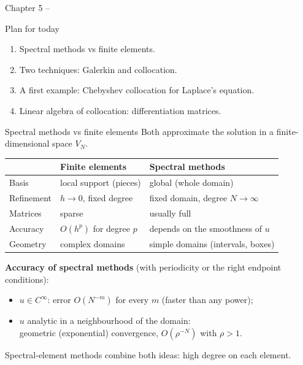 
{Chapter 5}
{}
{--}

\begin{frame}{Plan for today}
    \begin{enumerate}
        \item Spectral methods vs finite elements.
        \item Two techniques: Galerkin and collocation.
        \item A first example: Chebyshev collocation for Laplace's equation.
        \item Linear algebra of collocation: differentiation matrices.
    \end{enumerate}
    \bigskip
\end{frame}

\begin{frame}{Spectral methods vs finite elements}
    Both approximate the solution in a finite-dimensional space $V_N$.
    \medskip
    \begin{center}
        \begin{tabular}{@{}lll@{}}
            \toprule
                       & Finite elements           & Spectral methods                    \\
            \midrule
            Basis      & local support (pieces)    & global (whole domain)               \\
            Refinement & $h \to 0$, fixed degree   & fixed domain, degree $N \to \infty$ \\
            Matrices   & sparse                    & usually full                        \\
            Accuracy   & $O(h^{p})$ for degree $p$ & depends on the smoothness of $u$    \\
            Geometry   & complex domains           & simple domains (intervals, boxes)   \\
            \bottomrule
        \end{tabular}
    \end{center}
    \medskip
    \textbf{Accuracy of spectral methods} (with periodicity or the right endpoint conditions):
    \begin{itemize}
        \item $u \in C^\infty$: error $O(N^{-m})$ for every $m$ (faster than any power);
        \item $u$ analytic in a neighbourhood of the domain:\\ \alert{geometric} (exponential) convergence, $O(\rho^{-N})$ with $\rho > 1$.
    \end{itemize}
    {\small Spectral-element methods combine both ideas: high degree on each element.}
\end{frame}

